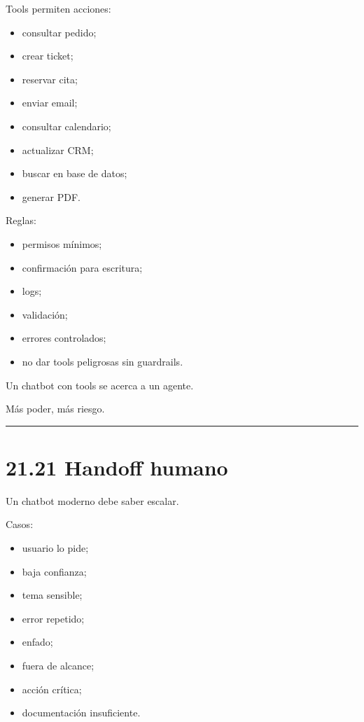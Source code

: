 Tools permiten acciones:

\begin{itemize}
\tightlist
\item
  consultar pedido;
\item
  crear ticket;
\item
  reservar cita;
\item
  enviar email;
\item
  consultar calendario;
\item
  actualizar CRM;
\item
  buscar en base de datos;
\item
  generar PDF.
\end{itemize}

Reglas:

\begin{itemize}
\tightlist
\item
  permisos mínimos;
\item
  confirmación para escritura;
\item
  logs;
\item
  validación;
\item
  errores controlados;
\item
  no dar tools peligrosas sin guardrails.
\end{itemize}

Un chatbot con tools se acerca a un agente.

Más poder, más riesgo.

\begin{center}\rule{0.5\linewidth}{0.5pt}\end{center}

\section{21.21 Handoff humano}\label{handoff-humano}

Un chatbot moderno debe saber escalar.

Casos:

\begin{itemize}
\tightlist
\item
  usuario lo pide;
\item
  baja confianza;
\item
  tema sensible;
\item
  error repetido;
\item
  enfado;
\item
  fuera de alcance;
\item
  acción crítica;
\item
  documentación insuficiente.
\end{itemize}

